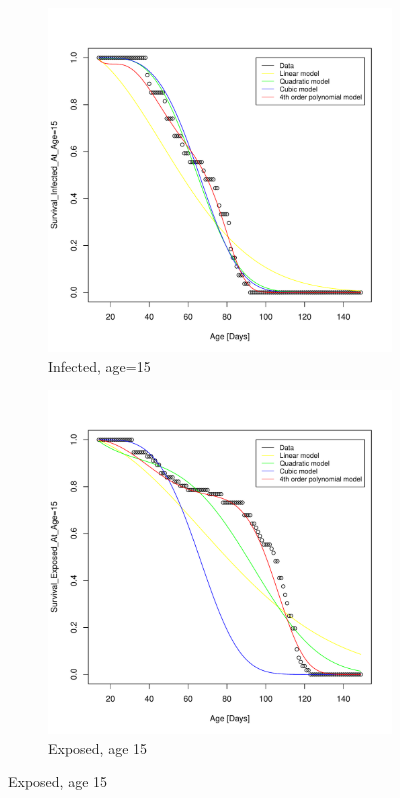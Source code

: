 \documentclass[10pt]{article}         %
\begin{document}
\begin{figure}[!ht]
\ContinuedFloat
  \begin{subfigure}[b]{0.6\textwidth}
    \includegraphics[width=\textwidth]{Fitting_delta_inf_at_age_15.pdf}
    \caption{Infected, age=15}
    \label{fig:subfigure_3}
  \end{subfigure}
  \begin{subfigure}[b]{0.6\textwidth}
    \includegraphics[width=\textwidth]{Fitting_delta_exp_at_age_15.pdf}
    \caption{Exposed, age 15}
    \label{fig:subfigure_4}
  \end{subfigure}


\end{figure}
\end{document}
